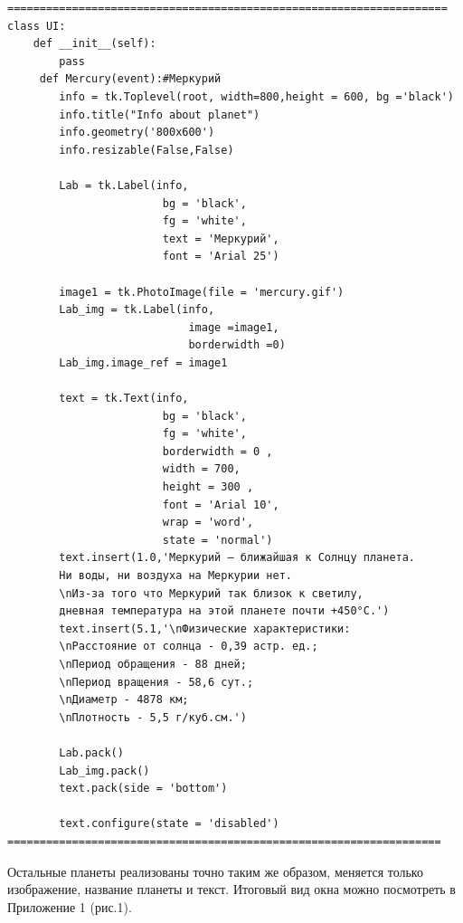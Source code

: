 \documentclass[11pt,a4paper]{report}
\begin{document}
\begin{verbatim}
====================================================================
class UI:
    def __init__(self):
        pass
     def Mercury(event):#Меркурий
        info = tk.Toplevel(root, width=800,height = 600, bg ='black')        
        info.title("Info about planet") 
        info.geometry('800x600')
        info.resizable(False,False) 
        
        Lab = tk.Label(info, 
                        bg = 'black',
                        fg = 'white',
                        text = 'Меркурий', 
                        font = 'Arial 25')
                        
        image1 = tk.PhotoImage(file = 'mercury.gif')
        Lab_img = tk.Label(info,
                            image =image1,
                            borderwidth =0)
        Lab_img.image_ref = image1
        
        text = tk.Text(info,
                        bg = 'black',
                        fg = 'white', 
                        borderwidth = 0 ,
                        width = 700, 
                        height = 300 , 
                        font = 'Arial 10', 
                        wrap = 'word', 
                        state = 'normal')
        text.insert(1.0,'Меркурий — ближайшая к Солнцу планета. 
        Ни воды, ни воздуха на Меркурии нет. 
        \nИз-за того что Меркурий так близок к светилу, 
        дневная температура на этой планете почти +450°С.')
        text.insert(5.1,'\nФизические характеристики:
        \nРасстояние от солнца - 0,39 астр. ед.;
        \nПериод обращения - 88 дней;
        \nПериод вращения - 58,6 сут.;
        \nДиаметр - 4878 км;
        \nПлотность - 5,5 г/куб.см.')
        
        Lab.pack()
        Lab_img.pack()
        text.pack(side = 'bottom')
        
        text.configure(state = 'disabled')
===================================================================
\end{verbatim}
Остальные планеты реализованы точно таким же образом, меняется только изображение, название планеты и текст.
Итоговый вид окна можно посмотреть в Приложение 1 (рис.1).














\end{document}
